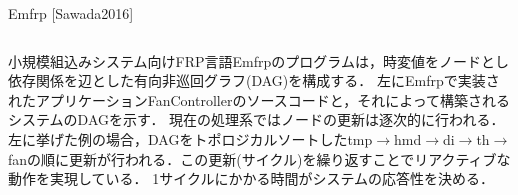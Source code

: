 \documentclass[dvipdfmx,final,t,10pt]{beamer}
\begin{document}
\begin{frame}[fragile]
    \begin{block}{Emfrp \small{[Sawada2016]}}
        \begin{columns}
            \begin{column}{0.55\textwidth}
                \vskip 0.01cm
                小規模組込みシステム向けFRP言語Emfrpのプログラムは，時変値をノードとし依存関係を辺とした有向非巡回グラフ(DAG)を構成する．
                左にEmfrpで実装されたアプリケーションFanControllerのソースコードと，それによって構築されるシステムのDAGを示す．
                現在の処理系ではノードの更新は逐次的に行われる．左に挙げた例の場合，DAGをトポロジカルソートしたtmp$\rightarrow$hmd$\rightarrow$di$\rightarrow$th$\rightarrow$fanの順に更新が行われる．この更新(サイクル)を繰り返すことでリアクティブな動作を実現している．
                1サイクルにかかる時間がシステムの応答性を決める．


\end{column}
\end{columns}
\end{block}
\end{frame}
\end{document}
